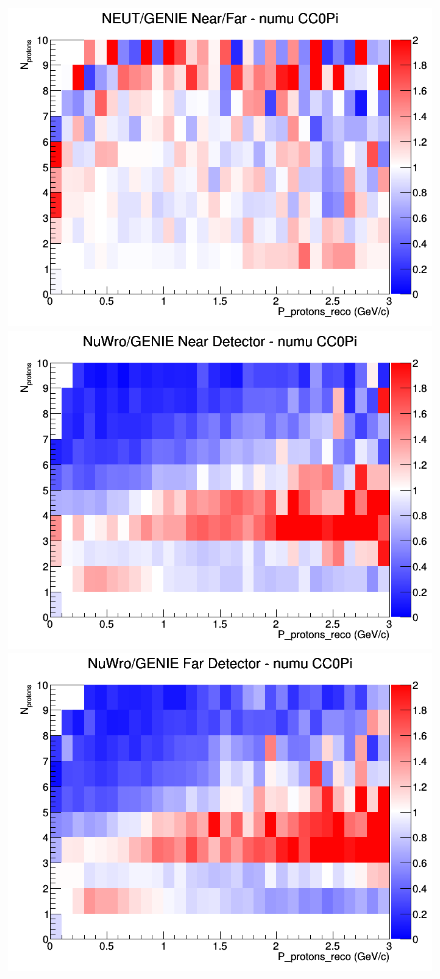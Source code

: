 \documentclass[12pt]{article}
\begin{document}
\begin{figure}[h]
\endminipage
{}
\includegraphics[width=\linewidth]{eff_N_P/LAr/protons/ratios/CC0Pi_NEUT_GENIE_numu_NF_N_P.png}
\endminipage
\newline
{}
\includegraphics[width=\linewidth]{eff_N_P/LAr/protons/ratios/CC0Pi_NuWro_GENIE_numu_near_N_P.png}
\endminipage
{}
\includegraphics[width=\linewidth]{eff_N_P/LAr/protons/ratios/CC0Pi_NuWro_GENIE_numu_far_N_P.png}

\end{figure}
\end{document}
